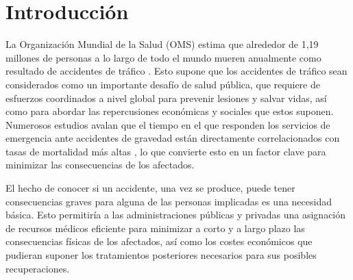 \documentclass{uathesis-es}
\begin{document}
	
	\chapter{Introducción}
	
	
	
	
	
	
	
	
	
	La Organización Mundial de la Salud (OMS) estima que alrededor de 1,19 millones de personas a lo largo de todo el mundo mueren anualmente como resultado de accidentes de tráfico \cite{WHO}. Esto supone que los accidentes de tráfico sean considerados como un importante desafío de salud pública, que requiere de esfuerzos coordinados a nivel global para prevenir lesiones y salvar vidas, así como para abordar las repercusiones económicas y sociales que estos suponen. Numerosos estudios avalan que el tiempo en el que responden los servicios de emergencia ante accidentes de gravedad están directamente correlacionados con tasas de mortalidad más altas \cite{timeresponse_deaths}, lo que convierte esto en un factor clave para minimizar las consecuencias de los afectados.
	
	
	
	El hecho de conocer si un accidente, una vez se produce, puede tener consecuencias graves para alguna de las personas implicadas es una necesidad básica. Esto permitiría a las administraciones públicas y privadas una asignación de recursos médicos eficiente para minimizar a corto y a largo plazo las consecuencias físicas de los afectados, así como los costes económicos que pudieran suponer los tratamientos posteriores necesarios para sus posibles recuperaciones.  
	
\end{document}

